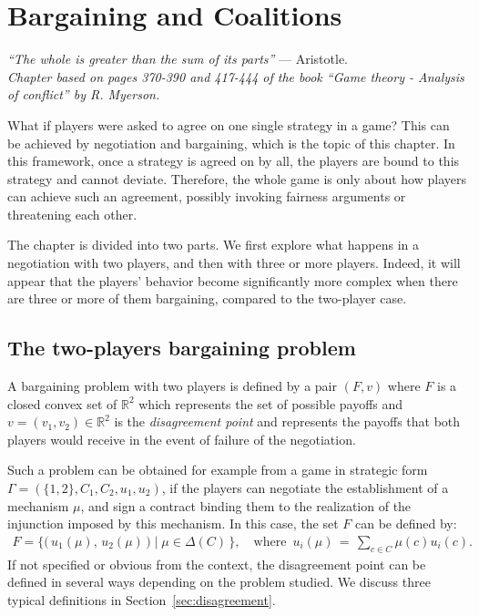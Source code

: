 \ifx \globalmark \undefined %
	
\else 	
\fi




\chapter{Bargaining and Coalitions}
{\large{\itshape
``The whole is greater than the sum of its parts''} --- Aristotle.\\
}
\label{chap:Bar}
{\small{\itshape
Chapter based on pages 370-390 and 417-444 of the book  ``Game theory - Analysis of conflict'' by R. Myerson.}\\
}


What if players were asked to agree on one single strategy in a game? This can be achieved by negotiation and bargaining, which is the topic of this chapter. In this framework, once a strategy is agreed on by all, the players are bound to this strategy and cannot deviate. Therefore, the whole game is only about how players can achieve such an agreement, possibly invoking fairness arguments or threatening each other.

The chapter is divided into two parts. We first explore what happens in a negotiation with two players, and then with three or more players. Indeed, it will appear that the players' behavior become significantly more complex when there are three or more of them bargaining, compared to the two-player case.



\section{The two-players bargaining problem}



A bargaining problem with two players is defined by a pair $(F, v)$ where $F$ is a closed convex set of $\mathbb{R}^2$ which represents the set of possible payoffs and $v = (v_1, v_2) \in \mathbb{R}^2$ is the \emph{disagreement point} and represents the payoffs that both players would receive in the event of failure of the negotiation.

Such a problem can be obtained for example from a game in strategic form $\Gamma = (\{ 1,2 \}, C_1, C_2, u_1, u_2)$, if the players can negotiate the establishment of a mechanism $\mu$, and sign a contract binding them to the realization of the injunction imposed by this mechanism. In this case, the set $F$ can be defined by:
\begin{align*}
	F = \Big\{ \big( \, u_1(\mu), \, u_2(\mu) \, \big) \; | \; \mu \in \Delta(C) \, \Big\}, \quad \text{where } \, u_i(\mu) \, = \, \sum_{c \in C} \mu(c) u_i(c).
\end{align*}
If not specified or obvious from the context, the disagreement point can be defined in several ways depending on the problem studied. We discuss three typical definitions in Section~\ref{sec:disagreement}.


